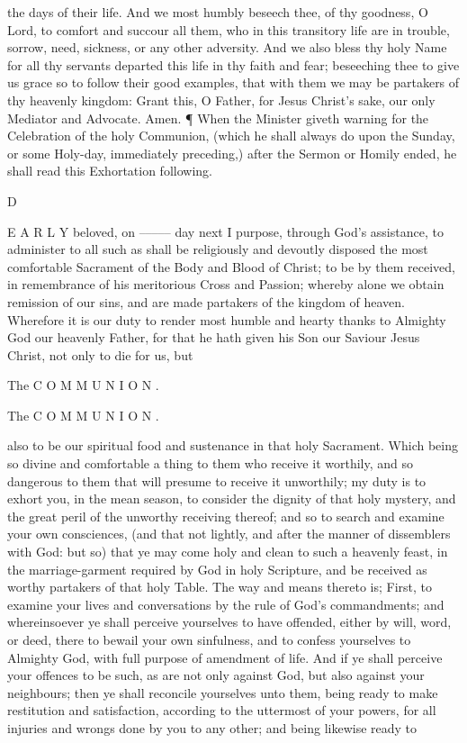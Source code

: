the days of their life. And we most humbly beseech thee, of thy goodness, O Lord, to comfort and succour all them, who in this transitory life are in trouble, sorrow, need, sickness, or any other adversity. And we also bless thy holy Name for all thy servants departed this life in thy faith and fear; beseeching thee to give us grace so to follow their good examples, that with them we may be partakers of thy heavenly kingdom: Grant this, O Father, for Jesus Christ’s sake, our only Mediator and Advocate. Amen. ¶ When the Minister giveth warning for the Celebration of the holy Communion, (which he shall always do upon the Sunday, or some Holy-day, immediately preceding,) after the Sermon or Homily ended, he shall read this Exhortation following.

D

E A R L Y beloved, on ––––– day next I purpose, through God’s assistance, to administer to all such as shall be religiously and devoutly disposed the most comfortable Sacrament of the Body and Blood of Christ; to be by them received, in remembrance of his meritorious Cross and Passion; whereby alone we obtain remission of our sins, and are made partakers of the kingdom of heaven. Wherefore it is our duty to render most humble and hearty thanks to Almighty God our heavenly Father, for that he hath given his Son our Saviour Jesus Christ, not only to die for us, but

The C O M M U N I O N .

The C O M M U N I O N .

also to be our spiritual food and sustenance in that holy Sacrament. Which being so divine and comfortable a thing to them who receive it worthily, and so dangerous to them that will presume to receive it unworthily; my duty is to exhort you, in the mean season, to consider the dignity of that holy mystery, and the great peril of the unworthy receiving thereof; and so to search and examine your own consciences, (and that not lightly, and after the manner of dissemblers with God: but so) that ye may come holy and clean to such a heavenly feast, in the marriage-garment required by God in holy Scripture, and be received as worthy partakers of that holy Table. The way and means thereto is; First, to examine your lives and conversations by the rule of God’s commandments; and whereinsoever ye shall perceive yourselves to have offended, either by will, word, or deed, there to bewail your own sinfulness, and to confess yourselves to Almighty God, with full purpose of amendment of life. And if ye shall perceive your offences to be such, as are not only against God, but also against your neighbours; then ye shall reconcile yourselves unto them, being ready to make restitution and satisfaction, according to the uttermost of your powers, for all injuries and wrongs done by you to any other; and being likewise ready to

